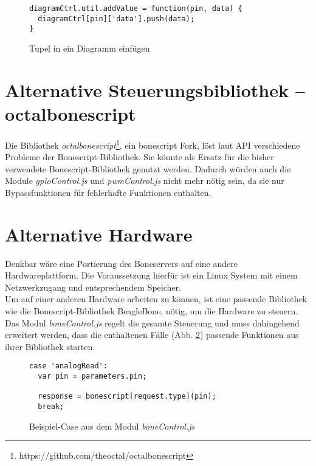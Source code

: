 \begin{figure}[H]
\begin{lstlisting}
diagramCtrl.util.addValue = function(pin, data) {
  diagramCtrl[pin]['data'].push(data);
}
\end{lstlisting}
\caption{Tupel in ein Diagramm einfügen}
\label{lst:insertTupel}
\end{figure}


\section{Alternative Steuerungsbibliothek -- octalbonescript}
Die Bibliothek \textit{octalbonescript}\footnote{https://github.com/theoctal/octalbonescript}, ein bonescript Fork, löst laut API verschiedene Probleme der Bonescript-Bibliothek. Sie könnte als Ersatz für die bisher verwendete Bonescript-Bibliothek genutzt werden. Dadurch würden auch die Module \textit{gpioControl.js} und \textit{pwmControl.js} nicht mehr nötig sein, da sie nur Bypassfunktionen für fehlerhafte Funktionen enthalten.


\section{Alternative Hardware}
Denkbar wäre eine Portierung des Boneservers auf eine andere Hardwareplattform. Die Voraussetzung hierfür ist ein Linux System mit einem Netzwerkzugang und entsprechendem Speicher.\\

Um auf einer anderen Hardware arbeiten zu können, ist eine passende Bibliothek wie die Bonescript-Bibliothek BeagleBone, nötig, um die Hardware zu steuern. Das Modul \textit{boneControl.js} regelt die gesamte Steuerung und muss dahingehend erweitert werden, dass die enthaltenen Fälle (Abb. \ref{lst:exampleCase}) passende Funktionen aus ihrer Bibliothek starten.

\begin{figure}[H]
\begin{lstlisting}
case 'analogRead':
  var pin = parameters.pin;

  response = bonescript[request.type](pin);
  break;
\end{lstlisting}
\caption{Beispiel-Case aus dem Modul \textit{boneControl.js}}
\label{lst:exampleCase}
\end{figure}


